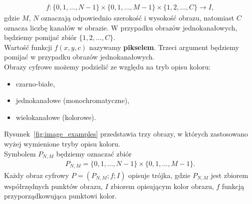 \begin{gather*}
  f: \{0, 1, ..., N-1\} \times \{0, 1, ..., M-1\} \times \{1, 2, ..., C\} \rightarrow I,
\end{gather*}
gdzie $M$, $N$ oznaczają odpowiednio szerokość i wysokość obrazu, natomiast $C$ oznacza liczbę kanałów w obrazie. W przypadku obrazów jednokanałowych, będziemy pomijać zbiór $\{1, 2, ..., C\}$.\\
Wartość funkcji $f(x, y, c)$ nazywamy \textbf{pikselem}. Trzeci argument będziemy pomijać w przypadku obrazów jednokanałowych. \\
Obrazy cyfrowe możemy podzielić ze względu na tryb opisu koloru:
\begin{itemize}
  \item czarno-białe,
  \item jednokanałowe (monochromatyczne),
  \item wielokanałowe (kolorowe).
\end{itemize}
Rysunek~\ref{fig:image_examples} przedstawia trzy obrazy, w których zastosowano wyżej wymienione tryby opisu koloru.\\
Symbolem $P_{N,M}$ będziemy oznaczać zbiór
\begin{gather*}
  P_{N,M} = \{0, 1, ..., N-1\} \times \{0, 1, ..., M-1\}.
\end{gather*}
Każdy obraz cyfrowy $P = (P_{N,M}; f; I)$ opisuje trójka, gdzie $P_{N,M}$ jest zbiorem współrzędnych punktów obrazu, $I$ zbiorem opisującym kolor obrazu, $f$ funkcją przyporządkowująca punktowi kolor.

